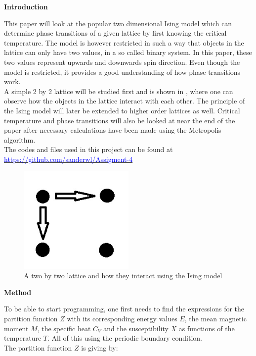 \documentclass[10pt,a4paper]{article}
\begin{document}
\newpage

\begin{center}
{\LARGE\bf Introduction}
\end{center}

\noindent This paper will look at the popular two dimensional Ising model which can determine phase transitions of a given lattice by first knowing the critical temperature. The model is however restricted in such a way that objects in the lattice can only have two values, in a so called binary system. In this paper, these two values represent upwards and downwards spin direction. Even though the model is restricted, it provides a good understanding of how phase transitions work.
\\
\noindent A simple 2 by 2 lattice will be studied first and is shown in , where one can observe how the objects in the lattice interact with each other. The principle of the Ising model will later be extended to higher order lattices as well. Critical temperature and phase transitions will also be looked at near the end of the paper after necessary calculations have been made using the Metropolis algorithm.
\\
\noindent The codes and files used in this project can be found at \href{https://github.com/sanderwl/Assigment-4}{\textcolor{blue}{https://github.com/sanderwl/Assigment-4}}

\begin{figure}[H]
\centering
\includegraphics[width=0.5\textwidth]{22lattice}
\caption{A two by two lattice and how they interact using the Ising model}
\label{fig:22lattice}
\end{figure}

\newpage

\begin{center}
{\LARGE\bf Method}
\end{center}

\noindent To be able to start programming, one first needs to find the expressions for the partition function $Z$ with its corresponding energy values $E$, the mean magnetic moment $M$, the specific heat $C_V$ and the susceptibility $X$ as functions of the temperature $T$. All of this using the periodic boundary condition.
\\
The partition function $Z$ is giving by: 
\end{document}
